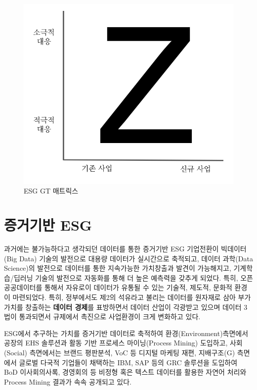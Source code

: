 \documentclass[smallextended]{svjour3}       %
\begin{document}
\begin{figure}

{\centering \includegraphics[width=1\linewidth]{fig/kpmg-gt-matrix} 

}

\caption{ESG GT 매트릭스}\label{fig:esg-matrix}
\end{figure}

\hypertarget{esg-data-science}{%
\section{증거기반 ESG}\label{esg-data-science}}

과거에는 불가능하다고 생각되던 데이터를 통한 증거기반 ESG 기업전환이
빅데이터(Big Data) 기술의 발전으로 대용량 데이터가 실시간으로 축적되고,
데이터 과학(Data Science)의 발전으로 데이터를 통한 지속가능한 가치창출과
발견이 가능해지고, 기계학습/딥러닝 기술의 발전으로 자동화를 통해 더 높은
예측력을 갖추게 되었다. 특히, 오픈 공공데이터를 통해서 자유로이 데이터가
유통될 수 있는 기술적, 제도적, 문화적 환경이 마련되었다. 특히,
정부에서도 제2의 석유라고 불리는 데이터를 원자재로 삼아 부가가치를
창출하는 \textbf{데이터 경제}를 표방하면서 데이터 산업이 각광받고 있으며
데이터 3법이 통과되면서 규제에서 촉진으로 사업환경이 크게 변화하고 있다.

ESG에서 추구하는 가치를 증거기반 데이터로 축적하여
환경(Environment)측면에서 공장의 EHS 솔루션과 활동 기반 프로세스
마이닝(Process Mining) 도입하고, 사회(Social) 측면에서는 브랜드
평판분석, VoC 등 디지털 마케팅 재편, 지배구조(G) 측면에서 글로벌 다국적
기업들이 채택하는 IBM, SAP 등의 GRC 솔루션을 도입하여 BoD 이사회의사록,
경영회의 등 비정형 혹은 텍스트 데이터를 활용한 자연어 처리와 Process
Mining 결과가 속속 공개되고 있다.
\end{document}
